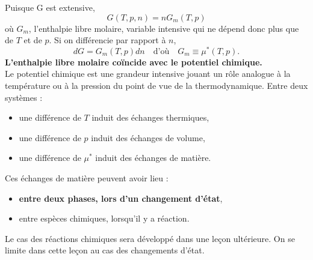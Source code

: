 \documentclass[11pt,a4paper]{report}
\begin{document}
Puisque G est extensive,
\begin{equation}
	G(T,p,n) = n G_m(T,p)
\end{equation}
où $G_m$, l'enthalpie libre molaire, variable intensive qui ne dépend donc plus que de $T$ et de $p$. Si on différencie par rapport à $n$, 
\begin{equation}
	dG = G_m(T,p) dn \quad\text{d'où}\quad
	G_m \equiv \mu^*(T,p).
\end{equation}
\textbf{L'enthalpie libre molaire coïncide avec le potentiel chimique.}\\

Le potentiel chimique est une grandeur intensive jouant un rôle analogue à la température ou à la pression du point de vue de la thermodynamique. Entre deux systèmes :
\begin{itemize}
	\item une différence de $T$ induit des échanges thermiques,
	\item une différence de $p$ induit des échanges de volume,
	\item une différence de $\mu^*$ induit des échanges de matière.\\
\end{itemize}

Ces échanges de matière peuvent avoir lieu :
\begin{itemize}
	\item \textbf{entre deux phases, lors d'un changement d'état},
	\item entre espèces chimiques, lorsqu'il y a réaction.\\
\end{itemize}
Le cas des réactions chimiques sera développé dans une leçon ultérieure. On se limite dans cette leçon au cas des changements d'état.
\end{document}
